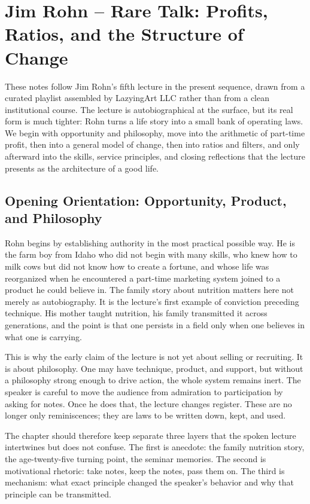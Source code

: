\chapter{Jim Rohn -- Rare Talk: Profits, Ratios, and the Structure of Change}

These notes follow Jim Rohn's fifth lecture in the present sequence, drawn from a curated playlist assembled by LazyingArt LLC rather than from a clean institutional course. The lecture is autobiographical at the surface, but its real form is much tighter: Rohn turns a life story into a small bank of operating laws. We begin with opportunity and philosophy, move into the arithmetic of part-time profit, then into a general model of change, then into ratios and filters, and only afterward into the skills, service principles, and closing reflections that the lecture presents as the architecture of a good life.

\section{Opening Orientation: Opportunity, Product, and Philosophy}

Rohn begins by establishing authority in the most practical possible way. He is the farm boy from Idaho who did not begin with many skills, who knew how to milk cows but did not know how to create a fortune, and whose life was reorganized when he encountered a part-time marketing system joined to a product he could believe in. The family story about nutrition matters here not merely as autobiography. It is the lecture's first example of conviction preceding technique. His mother taught nutrition, his family transmitted it across generations, and the point is that one persists in a field only when one believes in what one is carrying.

This is why the early claim of the lecture is not yet about selling or recruiting. It is about philosophy. One may have technique, product, and support, but without a philosophy strong enough to drive action, the whole system remains inert. The speaker is careful to move the audience from admiration to participation by asking for notes. Once he does that, the lecture changes register. These are no longer only reminiscences; they are laws to be written down, kept, and used.

The chapter should therefore keep separate three layers that the spoken lecture intertwines but does not confuse. The first is anecdote: the family nutrition story, the age-twenty-five turning point, the seminar memories. The second is motivational rhetoric: take notes, keep the notes, pass them on. The third is mechanism: what exact principle changed the speaker's behavior and why that principle can be transmitted.

